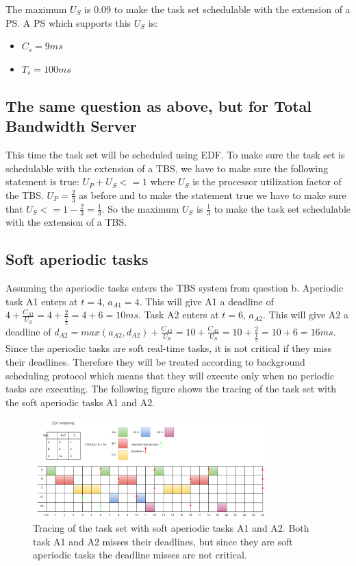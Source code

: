         The maximum $U_S$ is $0.09$ to make the task set schedulable with the extension of a PS. A PS which supports this $U_S$ is:
        \begin{itemize}
            \item $C_s = 9ms$
            \item $T_s = 100ms$
        \end{itemize}

    \subsection{The same question as above, but for Total Bandwidth Server}
        
        This time the task set will be scheduled using EDF. To make sure the task set is schedulable with the extension of a TBS, we have to make sure the following statement is true: $U_P + U_S <= 1$ where $U_S$ is the processor utilization factor of the TBS. $U_P = \frac{2}{3}$ as before and to make the statement true we have to make sure that $U_S <= 1 - \frac{2}{3} = \frac{1}{3}$. So the maximum $U_S$ is $\frac{1}{3}$ to make the task set schedulable with the extension of a TBS.

    \subsection{Soft aperiodic tasks}
        
        Assuming the aperiodic tasks enters the TBS system from question b. Aperiodic task A1 enters at $t=4$, $a_{A1} = 4$. This will give A1 a deadline of $4 + \frac{C_{A1}}{U_S} = 4 + \frac{2}{\frac{1}{3}} = 4 + 6 = 10ms$. Task A2 enters at $t=6$, $a_{A2}$. This will give A2 a deadline of $d_{A2} = max(a_{A2}, d_{A2}) + \frac{C_{A2}}{U_S} = 10 + \frac{C_{A2}}{U_S} = 10 + \frac{2}{\frac{1}{3}} = 10 + 6 = 16ms$. Since the aperiodic tasks are soft real-time tasks, it is not critical if they miss their deadlines. Therefore they will be treated according to background scheduling protocol which means that they will execute only when no periodic tasks are executing. The following figure shows the tracing of the task set with the soft aperiodic tasks A1 and A2.

        \begin{figure}[H]
            \centering
            \includegraphics[width=0.8\textwidth]{images/Ass1Q8c.png}
            \caption{Tracing of the task set with soft aperiodic tasks A1 and A2. Both task A1 and A2 misses their deadlines, but since they are soft aperiodic tasks the deadline misses are not critical.}
            \label{fig:Q8trace}
        \end{figure}